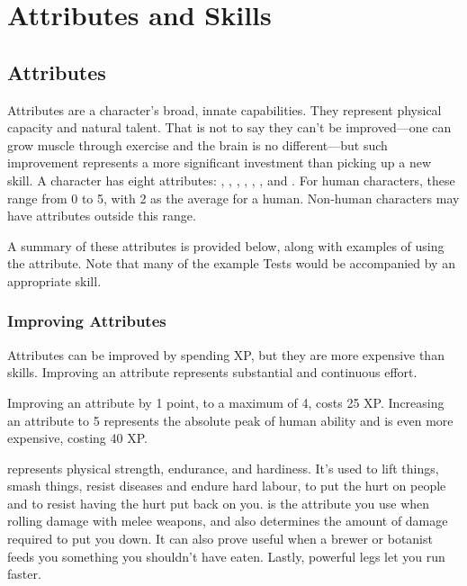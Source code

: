 \chapter{Attributes and Skills}

\section{Attributes}

Attributes are a character's broad, innate capabilities.
They represent physical capacity and natural talent.
That is not to say they can't be improved---one can grow muscle through exercise and the brain is no different---but such improvement represents a more significant investment than picking up a new skill.
A character has eight attributes: , , , , , ,  and .
For human characters, these range from 0 to 5, with 2 as the average for a human.
Non-human characters may have attributes outside this range.

A summary of these attributes is provided below, along with examples of using the attribute.
Note that many of the example Tests would be accompanied by an appropriate skill.

\subsection{Improving Attributes}

Attributes can be improved by spending XP, but they are more expensive than skills.
Improving an attribute represents substantial and continuous effort.

Improving an attribute by 1 point, to a maximum of 4, costs 25 XP.
Increasing an attribute to 5 represents the absolute peak of human ability and is even more expensive, costing 40 XP.


 represents physical strength, endurance, and hardiness.
It's used to lift things, smash things, resist diseases and endure hard labour, to put the hurt on people and to resist having the hurt put back on you.
 is the attribute you use when rolling damage with melee weapons, and also determines the amount of damage required to put you down.
It can also prove useful when a brewer or botanist feeds you something you shouldn't have eaten.
Lastly, powerful legs let you run faster.

